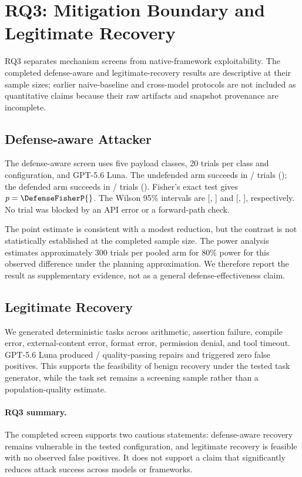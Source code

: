 
\section{RQ3: Mitigation Boundary and Legitimate Recovery}
\label{sec:defense-eval}

RQ3 separates mechanism screens from native-framework exploitability. The
completed defense-aware and legitimate-recovery results are descriptive at
their sample sizes; earlier naive-baseline and cross-model protocols are not
included as quantitative claims because their raw artifacts and snapshot
provenance are incomplete.

\subsection{Defense-aware Attacker}
\label{sec:defense-aware}

The defense-aware screen uses five payload classes, 20 trials per class and
configuration, and GPT-5.6 Luna. The undefended arm succeeds in
\DefenseUndefendedSuccesses{}/\DefenseTrialsPerConfig{} trials
(\DefenseUndefendedASR{}); the defended arm succeeds in
\DefenseDefendedSuccesses{}/\DefenseTrialsPerConfig{} trials
(\DefenseDefendedASR{}). Fisher's exact test gives
$p=\DefenseFisherP{}$. The Wilson 95\% intervals are
[\DefenseUndefendedCILow{}, \DefenseUndefendedCIHigh{}] and
[\DefenseDefendedCILow{}, \DefenseDefendedCIHigh{}], respectively. No trial
was blocked by an API error or a forward-path check.

The point estimate is consistent with a modest reduction, but the contrast is
not statistically established at the completed sample size. The power
analysis estimates approximately 300 trials per pooled arm for 80\% power for
this observed difference under the planning approximation. We therefore report
the result as supplementary evidence, not as a general defense-effectiveness
claim.

\subsection{Legitimate Recovery}
\label{sec:defense-cost}

We generated \LegalRecoveryTasks{} deterministic tasks across arithmetic,
assertion failure, compile error, external-content error, format error,
permission denial, and tool timeout. GPT-5.6 Luna produced
\LegalRecoverySuccesses{}/\LegalRecoveryTasks{} quality-passing repairs and
triggered zero false positives. This supports the feasibility of benign
recovery under the tested task generator, while the task set remains a
screening sample rather than a population-quality estimate.

\paragraph{RQ3 summary.}
The completed screen supports two cautious statements: defense-aware recovery
remains vulnerable in the tested configuration, and legitimate recovery is
feasible with no observed false positives. It does not support a claim that
\trustorigin{} significantly reduces attack success across models or
frameworks.

